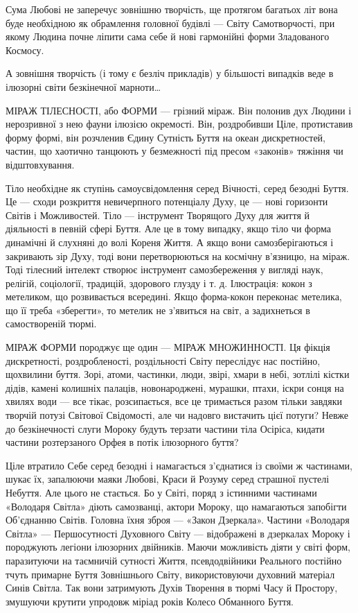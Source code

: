 Сума Любові не заперечує зовнішню творчість, ще протягом багатьох літ вона буде
необхідною як обрамлення головної будівлі — Світу Самотворчості, при якому
Людина почне ліпити сама себе й нові гармонійні форми Зладованого Космосу.

А зовнішня творчість (і тому є безліч прикладів) у більшості випадків веде в
ілюзорні світи безкінечної марноти…

МІРАЖ ТІЛЕСНОСТІ, або ФОРМИ — грізний міраж. Він полонив дух Людини і
нерозривної з нею фауни ілюзією окремості. Він, роздробивши Ціле, протиставив
форму формі, він розчленив Єдину Сутність Буття на океан дискретностей, частин,
що хаотично танцюють у безмежності під пресом «законів» тяжіння чи
відштовхування.

Тіло необхідне як ступінь самоусвідомлення серед Вічності, серед безодні Буття.
Це — сходи розкриття невичерпного потенціалу Духу, це — нові горизонти Світів і
Можливостей. Тіло — інструмент Творящого Духу для життя й діяльності в певній
сфері Буття. Але це в тому випадку, якщо тіло чи форма динамічні й слухняні до
волі Кореня Життя. А якщо вони самозберігаються і закривають зір Духу, тоді
вони перетворюються на космічну в’язницю, на міраж. Тоді тілесний інтелект
створює інструмент самозбереження у вигляді наук, релігій, соціології,
традицій, здорового глузду і т. д. Ілюстрація: кокон з метеликом, що
розвивається всередині. Якщо форма-кокон переконає метелика, що її треба
«зберегти», то метелик не з’явиться на світ, а задихнеться в самоствореній
тюрмі.

МІРАЖ ФОРМИ породжує ще один — МІРАЖ МНОЖИННОСТІ. Ця фікція дискретності,
роздробленості, роздільності Світу переслідує нас постійно, щохвилини буття.
Зорі, атоми, частинки, люди, звірі, хмари в небі, зотлілі кістки дідів, камені
колишніх палаців, новонароджені, мурашки, птахи, іскри сонця на хвилях води —
все тікає, розсипається, все це тримається разом тільки завдяки творчій потузі
Світової Свідомості, але чи надовго вистачить цієї потуги? Невже до
безкінечності слуги Мороку будуть терзати частини тіла Осіріса, кидати частини
розтерзаного Орфея в потік ілюзорного буття?

Ціле втратило Себе серед безодні і намагається з’єднатися із своїми ж
частинами, шукає їх, запалюючи маяки Любові, Краси й Розуму серед страшної
пустелі Небуття. Але цього не стається. Бо у Світі, поряд з істинними частинами
«Володаря Світла» діють самозванці, актори Мороку, що намагаються запобігти
Об’єднанню Світів. Головна їхня зброя — «Закон Дзеркала». Частини «Володаря
Світла» — Першосутності Духовного Світу — відображені в дзеркалах Мороку і
породжують легіони ілюзорних двійників. Маючи можливість діяти у світі форм,
паразитуючи на таємничій сутності Життя, псевдодвійники Реального постійно
тчуть примарне Буття Зовнішнього Світу, використовуючи духовний матеріал Синів
Світла. Так вони затримують Духів Творення в тюрмі Часу й Простору, змушуючи
крутити упродовж міріад років Колесо Обманного Буття.

